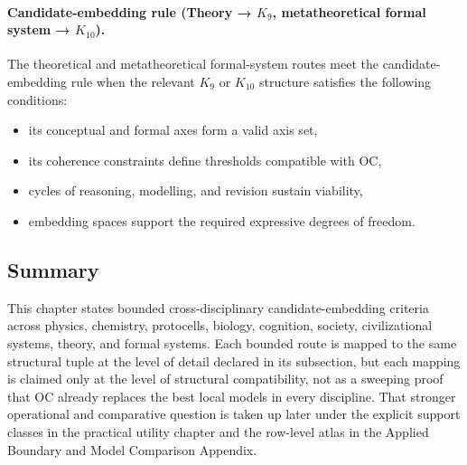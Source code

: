 \paragraph{Candidate-embedding rule (Theory → \texorpdfstring{\(K_9\)}{K9}, metatheoretical formal system → \texorpdfstring{\(K_{10}\)}{K10}).}
The theoretical and metatheoretical formal-system routes meet the
candidate-embedding rule when the relevant \(K_9\) or \(K_{10}\) structure satisfies the following
conditions:
\begin{itemize}
  \item its conceptual and formal axes form a valid axis set,
  \item its coherence constraints define thresholds compatible with OC,
  \item cycles of reasoning, modelling, and revision sustain viability,
  \item embedding spaces support the required expressive degrees of freedom.
\end{itemize}

\subsection*{Summary}

This chapter states bounded cross-disciplinary candidate-embedding criteria across
physics, chemistry, protocells, biology, cognition, society, civilizational systems,
theory, and formal systems. Each bounded route is mapped to the same structural tuple at the level of detail declared in its subsection, but each mapping is
claimed only at the level of structural compatibility, not as a sweeping proof
that OC already replaces the best local models in every discipline. That
stronger operational and comparative question is taken up later under the
explicit support classes in the practical utility chapter
and the row-level atlas in
the Applied Boundary and Model Comparison Appendix.

